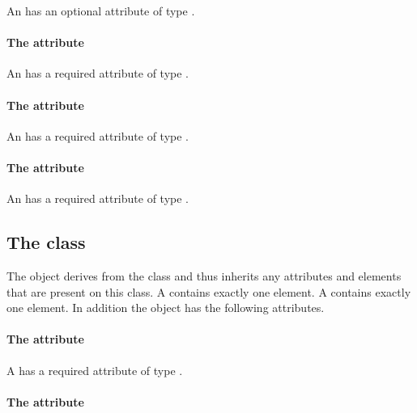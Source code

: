 An \Image has an optional attribute  of type \RelAbsVector.

\paragraph{The \fixttspace{} attribute}

An \Image has a required attribute  of type \RelAbsVector.

\paragraph{The \fixttspace{} attribute}

An \Image has a required attribute  of type \RelAbsVector.

\paragraph{The \fixttspace{} attribute}

An \Image has a required attribute  of type
.

\subsection{The  class}
\label{lineending-class}


The \LineEnding object derives from the 
class and thus inherits any attributes and elements that are present on
this class.
A \LineEnding contains exactly one  element.
A \LineEnding contains exactly one  element.
In addition the \LineEnding object has the following attributes.

\paragraph{The \fixttspace{} attribute}

A \LineEnding has a required attribute  of type
.

\paragraph{The \fixttspace{} attribute}

